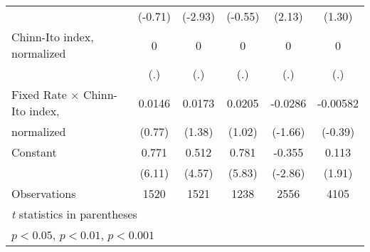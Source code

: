 \begin{table}[htbp]
\begin{tabular}{l*{5}{c}}
                                        &  (-0.71)         &  (-2.93)         &  (-0.55)         &   (2.13)         &   (1.30)         \\
\addlinespace
Chinn-Ito index, normalized             &        0         &        0         &        0         &        0         &        0         \\
                                        &      (.)         &      (.)         &      (.)         &      (.)         &      (.)         \\
\addlinespace
Fixed Rate $\times$ Chinn-Ito index,    &   0.0146         &   0.0173         &   0.0205         &  -0.0286         & -0.00582         \\
normalized                              &   (0.77)         &   (1.38)         &   (1.02)         &  (-1.66)         &  (-0.39)         \\
\addlinespace
Constant                                &    0.771\sym{***}&    0.512\sym{***}&    0.781\sym{***}&   -0.355\sym{**} &    0.113         \\
                                        &   (6.11)         &   (4.57)         &   (5.83)         &  (-2.86)         &   (1.91)         \\
\midrule
Observations                            &     1520         &     1521         &     1238         &     2556         &     4105         \\
\bottomrule
\multicolumn{6}{l}{\footnotesize \textit{t} statistics in parentheses}\\
\multicolumn{6}{l}{\footnotesize \sym{*} \(p<0.05\), \sym{**} \(p<0.01\), \sym{***} \(p<0.001\)}\\
\end{tabular}
\end{table}
